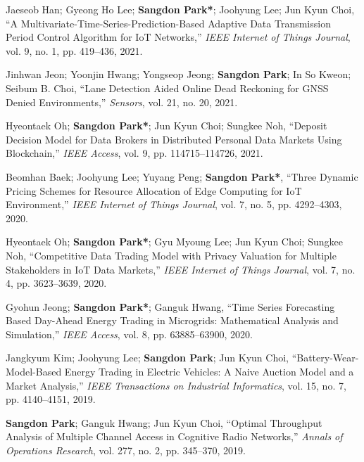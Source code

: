 \documentclass[11pt,a4paper]{article}
\begin{document}
\begin{enumerate}[label={[{\arabic*}]}, leftmargin=*, itemsep=0.3em]
\item Jaeseob Han; Gyeong Ho Lee; \textbf{Sangdon Park*}; Joohyung Lee; Jun Kyun Choi, ``A Multivariate-Time-Series-Prediction-Based Adaptive Data Transmission Period Control Algorithm for IoT Networks,'' \textit{IEEE Internet of Things Journal}, vol. 9, no. 1, pp. 419--436, 2021.

\item Jinhwan Jeon; Yoonjin Hwang; Yongseop Jeong; \textbf{Sangdon Park}; In So Kweon; Seibum B. Choi, ``Lane Detection Aided Online Dead Reckoning for GNSS Denied Environments,'' \textit{Sensors}, vol. 21, no. 20, 2021.

\item Hyeontaek Oh; \textbf{Sangdon Park*}; Jun Kyun Choi; Sungkee Noh, ``Deposit Decision Model for Data Brokers in Distributed Personal Data Markets Using Blockchain,'' \textit{IEEE Access}, vol. 9, pp. 114715--114726, 2021.

\item Beomhan Baek; Joohyung Lee; Yuyang Peng; \textbf{Sangdon Park*}, ``Three Dynamic Pricing Schemes for Resource Allocation of Edge Computing for IoT Environment,'' \textit{IEEE Internet of Things Journal}, vol. 7, no. 5, pp. 4292--4303, 2020.

\item Hyeontaek Oh; \textbf{Sangdon Park*}; Gyu Myoung Lee; Jun Kyun Choi; Sungkee Noh, ``Competitive Data Trading Model with Privacy Valuation for Multiple Stakeholders in IoT Data Markets,'' \textit{IEEE Internet of Things Journal}, vol. 7, no. 4, pp. 3623--3639, 2020.

\item Gyohun Jeong; \textbf{Sangdon Park*}; Ganguk Hwang, ``Time Series Forecasting Based Day-Ahead Energy Trading in Microgrids: Mathematical Analysis and Simulation,'' \textit{IEEE Access}, vol. 8, pp. 63885--63900, 2020.

\item Jangkyum Kim; Joohyung Lee; \textbf{Sangdon Park}; Jun Kyun Choi, ``Battery-Wear-Model-Based Energy Trading in Electric Vehicles: A Naive Auction Model and a Market Analysis,'' \textit{IEEE Transactions on Industrial Informatics}, vol. 15, no. 7, pp. 4140--4151, 2019.

\item \textbf{Sangdon Park}; Ganguk Hwang; Jun Kyun Choi, ``Optimal Throughput Analysis of Multiple Channel Access in Cognitive Radio Networks,'' \textit{Annals of Operations Research}, vol. 277, no. 2, pp. 345--370, 2019.


\end{enumerate}
\end{document}
